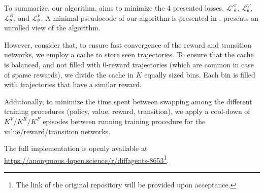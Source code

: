 To summarize, our algorithm, aims to minimize the 4 presented losses, $\mathcal{L'}_\theta^{\pi}$, $\mathcal{L}_\theta^V$, $\mathcal{L}_\theta^R$, and $\mathcal{L}_\theta^F$. A minimal pseudocode of our algorithm is presented in .  presents an unrolled view of the \fname{} algorithm.

However, consider that, to ensure fast convergence of the reward and transition networks, we employ a cache to store seen trajectories. To ensure that the cache is balanced, and not filled with $0$-reward trajectories (which are common in case of sparse rewards), we divide the cache in $K$ equally sized bins. Each bin is filled with trajectories that have a similar reward. 

Additionally, to minimize the time spent between swapping among the different training procedures (policy, value, reward, transition), we apply a cool-down of $K^V$/$K^R$/$K^F$ episodes between running training procedure for the value/reward/transition networks. 

The full implementation is openly available at \url{https://anonymous.4open.science/r/diffagents-8653}\footnote{The link of the original repository will be provided upon acceptance.}.





